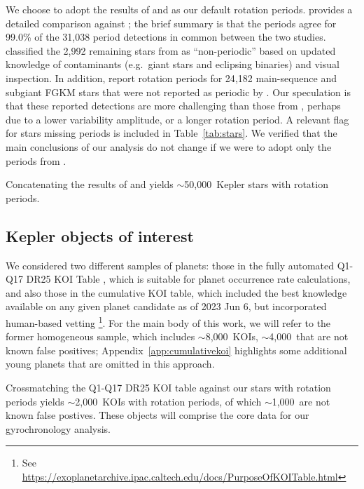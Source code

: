 \documentclass[11pt,twocolumn,tighten]{aastex63}
\newcommand{\nstarswithprot}{{$\sim$50{,}000}}
\newcommand{\nkois}{{$\sim$8{,}000}} %
\newcommand{\nkoisnofp}{{$\sim$4{,}000}} %
\newcommand{\nkoiswithprot}{{$\sim$2{,}000}}
\newcommand{\nkoisnofpwithprot}{{$\sim$1{,}000}}
\begin{document}
We choose to adopt the results of  and
 as our default rotation periods.
 provides a detailed comparison against
; the brief summary is that the periods
agree for 99.0\% of the 31{,}038 period detections in common between
the two studies.   classified the 2{,}992
remaining stars from  as ``non-periodic''
based on updated knowledge of contaminants (e.g.~giant stars and
eclipsing binaries) and visual inspection.  In addition,
 report rotation periods for 24{,}182
main-sequence and subgiant FGKM stars that were not reported as
periodic by .  Our speculation is that
these reported detections are more challenging than those from
, perhaps due to a lower variability
amplitude, or a longer rotation period.  A relevant flag for stars
missing  periods is included in
Table~\ref{tab:stars}.
We verified that the main conclusions of our analysis do not change if
we were to adopt only the periods from .

Concatenating the results of  and
 yields \nstarswithprot\ Kepler stars with
rotation periods.



\subsection{Kepler objects of interest}
\label{subsec:planetsel}

We considered two different samples of planets: those in the fully
automated Q1-Q17 DR25 KOI Table \citep{Thompson_2018}, which is
suitable for planet occurrence rate calculations, and also those in
the cumulative KOI table, which included the best knowledge available
on any given planet candidate as of 2023 Jun 6, but incorporated
human-based vetting \footnote{See
\url{https://exoplanetarchive.ipac.caltech.edu/docs/PurposeOfKOITable.html}}.
For the main body of this work, we will refer to the former
homogeneous sample, which includes \nkois\ KOIs, \nkoisnofp\ that are
not known false positives;
Appendix~\ref{app:cumulativekoi} highlights some additional young
planets that are omitted in this approach.

Crossmatching the Q1-Q17 DR25 KOI table against our stars with
rotation periods yields \nkoiswithprot\ KOIs with rotation periods, of which \nkoisnofpwithprot\ 
are not known false postives.
These objects will comprise the core data for our gyrochronology analysis.
\end{document}
